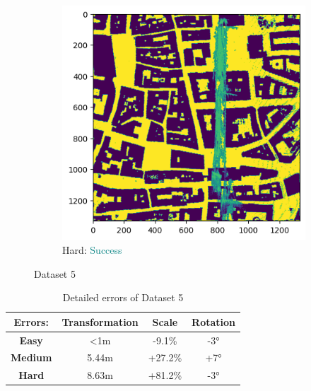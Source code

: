\documentclass[11pt]{article}
\begin{document}
\begin{figure}[p]
        \vspace{1em}

        \begin{subfigure}{0.45\textwidth}
            \centering
            \includegraphics[width=\linewidth]{images/full/hard/5_6_2_hard}
            \caption{Hard: \textcolor{teal}{Success}}
            \label{fig:5_6_2_hard}
        \end{subfigure}
        \hfill

        \caption{Dataset 5}
        \label{fig:res_5_6_2}
    \end{figure}

    \begin{table}[p]
        \centering
        \begin{tabular}{|c|c|c|c|}
          \hline
          \textbf{Errors:} & \textbf{Transformation} & \textbf{Scale} & \textbf{Rotation} \\
          \hline
          \textbf{Easy}   & <1m  & -9.1\% & -3° \\
          \hline
          \textbf{Medium} & 5.44m  & +27.2\% & +7° \\
          \hline
          \textbf{Hard}   & 8.63m  & +81.2\% & -3° \\
          \hline
        \end{tabular}
        \caption{Detailed errors of Dataset 5}
        \label{tab:tab_5}
    \end{table}
\end{document}
